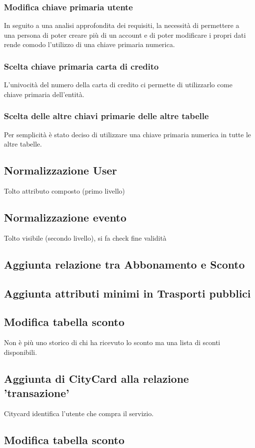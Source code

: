 \subsubsection{Modifica chiave primaria utente}
In seguito a una analisi approfondita dei requisiti, la necessità di permettere a una persona di poter creare più di un account e di poter modificare i propri dati rende comodo l'utilizzo di una chiave primaria numerica.  

\subsubsection{Scelta chiave primaria carta di credito}
L'univocità del numero della carta di credito ci permette di utilizzarlo come chiave primaria dell'entità.

\subsubsection{Scelta delle altre chiavi primarie delle altre tabelle}
Per semplicità è stato deciso di utilizzare una chiave primaria numerica in tutte le altre tabelle.

\subsection{Normalizzazione User} %
Tolto attributo composto (primo livello)

\subsection{Normalizzazione evento} %
Tolto visibile (secondo livello), si fa check fine validità

\subsection{Aggiunta relazione tra Abbonamento e Sconto} %

\subsection{Aggiunta attributi minimi in Trasporti pubblici} %

\subsection{Modifica tabella sconto} %
Non è più uno storico di chi ha ricevuto lo sconto ma una lista di sconti disponibili.

\subsection{Aggiunta di CityCard alla relazione 'transazione'} %
Citycard identifica l'utente che compra il servizio.

\subsection{Modifica tabella sconto} %
